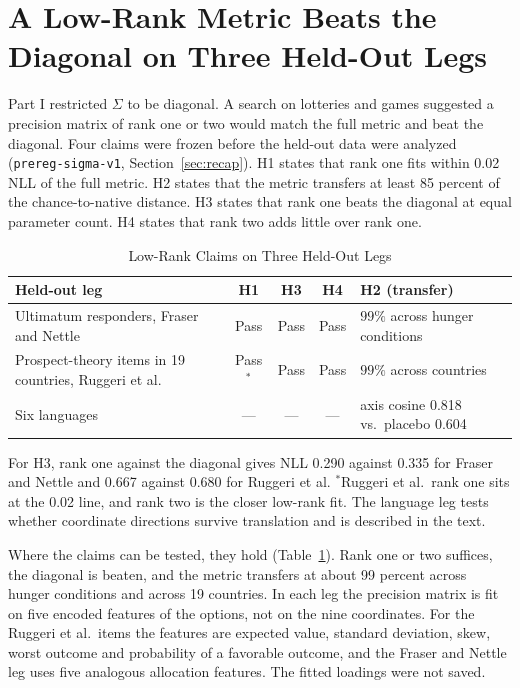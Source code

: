 \documentclass[journal]{IEEEtran}
\begin{document}
\section{A Low-Rank Metric Beats the Diagonal on Three Held-Out Legs}
\label{sec:lowrank}

Part I restricted $\Sigma$ to be diagonal.
A search on lotteries and games suggested a precision matrix of rank one or two would match the full metric and beat the diagonal.
Four claims were frozen before the held-out data were analyzed (\texttt{prereg-sigma-v1}, Section~\ref{sec:recap}).
H1 states that rank one fits within 0.02 NLL of the full metric.
H2 states that the metric transfers at least 85 percent of the chance-to-native distance.
H3 states that rank one beats the diagonal at equal parameter count.
H4 states that rank two adds little over rank one.

\begin{table}[!t]
\renewcommand{\arraystretch}{1.2}
\caption{Low-Rank Claims on Three Held-Out Legs}
\label{tab:lowrank}
\centering
\begin{tabular}{@{}p{} c c c p{}@{}}
\toprule
\textbf{Held-out leg} & \textbf{H1} & \textbf{H3} & \textbf{H4} & \textbf{H2 (transfer)} \\
\midrule
Ultimatum responders, Fraser and Nettle~\cite{fraser2020} & Pass & Pass & Pass & $99\%$ across hunger conditions \\
Prospect-theory items in 19 countries, Ruggeri et al.~\cite{ruggeri2020} & Pass$^{*}$ & Pass & Pass & $99\%$ across countries \\
Six languages & --- & --- & --- & axis cosine 0.818 vs.\ placebo 0.604 \\
\bottomrule
\end{tabular}
\begin{flushleft}
\footnotesize{For H3, rank one against the diagonal gives NLL 0.290 against 0.335 for Fraser and Nettle and 0.667 against 0.680 for Ruggeri et al. $^{*}$Ruggeri et al.\ rank one sits at the 0.02 line, and rank two is the closer low-rank fit. The language leg tests whether coordinate directions survive translation and is described in the text.}
\end{flushleft}
\end{table}

Where the claims can be tested, they hold (Table~\ref{tab:lowrank}).
Rank one or two suffices, the diagonal is beaten, and the metric transfers at about 99 percent across hunger conditions and across 19 countries.
In each leg the precision matrix is fit on five encoded features of the options, not on the nine coordinates.
For the Ruggeri et al.\ items the features are expected value, standard deviation, skew, worst outcome and probability of a favorable outcome, and the Fraser and Nettle leg uses five analogous allocation features.
The fitted loadings were not saved.
\end{document}
